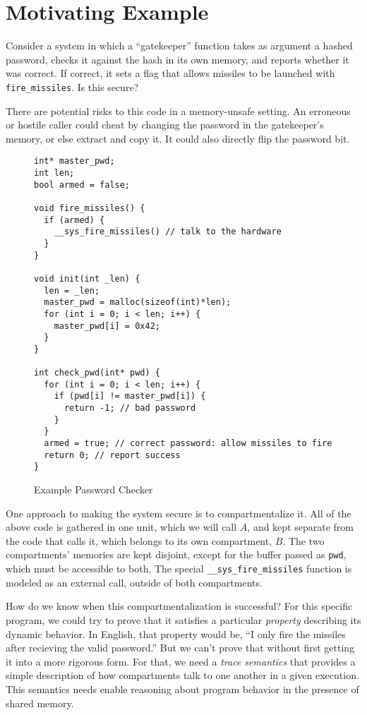 \documentclass{article}
\begin{document}



\section{Motivating Example}

Consider a system in which a ``gatekeeper'' function takes as argument a hashed password,
checks it against the hash in its own memory, and reports whether it was correct. If correct,
it sets a flag that allows missiles to be launched with {\tt fire\_missiles}. Is this secure?

There are potential risks to this code in a memory-unsafe setting. An erroneous or hostile caller
could cheat by changing the password in the gatekeeper's memory, or else extract and copy it. It
could also directly flip the password bit.

\begin{figure}
\begin{verbatim}
int* master_pwd;
int len;
bool armed = false;

void fire_missiles() {
  if (armed) {
    __sys_fire_missiles() // talk to the hardware
  } 
}

void init(int _len) {
  len = _len;
  master_pwd = malloc(sizeof(int)*len);
  for (int i = 0; i < len; i++) {
    master_pwd[i] = 0x42;
  }
}

int check_pwd(int* pwd) {
  for (int i = 0; i < len; i++) {
    if (pwd[i] != master_pwd[i]) {
      return -1; // bad password
    }
  }
  armed = true; // correct password: allow missiles to fire
  return 0; // report success
}
\end{verbatim}

\caption{Example Password Checker}
\label{fig:exchecker}
\end{figure}

One approach to making the system secure is to compartmentalize it. All of the above code
is gathered in one unit, which we will call \(A\), and kept separate from the code that calls
it, which belongs to its own compartment, \(B\). The two compartments' memories are kept disjoint,
except for the buffer passed as {\tt pwd}, which must be accessible to both. The special
{\tt \_\_sys\_fire\_missiles} function is modeled as an external call, outside of both compartments.

How do we know when this compartmentalization is successful? For this specific program,
we could try to prove that it satisfies a particular {\em property} describing its dynamic behavior.
In English, that property would be, ``I only fire the missiles after recieving the valid password.''
But we can't prove that without first getting it into a more rigorous form. For that, we
need a {\em trace semantics} that provides a simple description of how compartments talk to
one another in a given execution. This semantics needs enable reasoning about program behavior
in the presence of shared memory.
\end{document}
